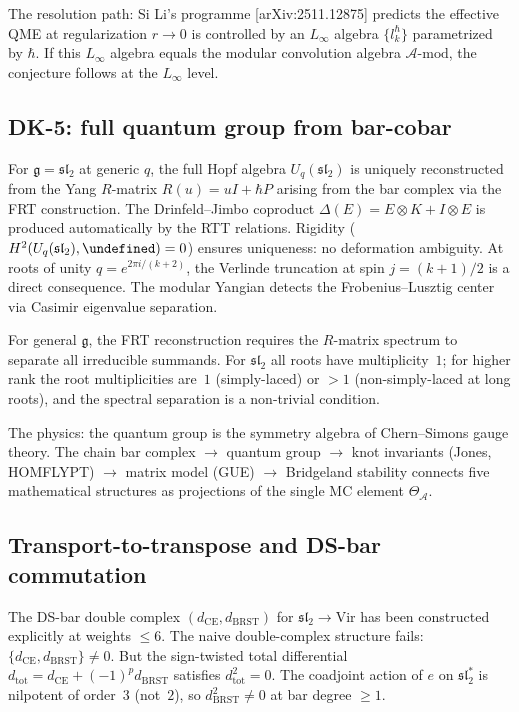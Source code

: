\documentclass[11pt]{article}
\let\Bbbk\undefined \let\openbox\undefined
\newcommand{\cA}{\mathcal{A}}
\newcommand{\fg}{\mathfrak{g}}
\newcommand{\gAmod}{\mathcal{A}\text{-mod}}
\providecommand{\bk}{\Bbbk}
\begin{document}
The resolution path: Si Li's programme [arXiv:2511.12875]
predicts the effective QME at regularization $r \to 0$ is
controlled by an $L_\infty$ algebra $\{l_k^{\hbar}\}$
parametrized by $\hbar$. If this $L_\infty$ algebra equals
the modular convolution algebra $\gAmod$, the conjecture
follows at the $L_\infty$ level.

\subsection{DK-5: full quantum group from bar-cobar}

For $\fg = \mathfrak{sl}_2$ at generic $q$, the full Hopf algebra
$U_q(\mathfrak{sl}_2)$ is uniquely reconstructed from the Yang
$R$-matrix $R(u) = uI + \hbar P$ arising from the bar complex
via the FRT construction. The Drinfeld--Jimbo coproduct
$\Delta(E) = E \otimes K + I \otimes E$ is produced automatically
by the RTT relations. Rigidity ($H^2(U_q(\mathfrak{sl}_2), \bk) = 0$)
ensures uniqueness: no deformation ambiguity. At roots of unity
$q = e^{2\pi i/(k+2)}$, the Verlinde truncation at spin $j = (k+1)/2$
is a direct consequence. The modular Yangian detects the
Frobenius--Lusztig center via Casimir eigenvalue separation.

For general $\fg$, the FRT reconstruction requires the $R$-matrix
spectrum to separate all irreducible summands. For $\mathfrak{sl}_2$
all roots have multiplicity~$1$; for higher rank the root
multiplicities are~$1$ (simply-laced) or $> 1$ (non-simply-laced
at long roots), and the spectral separation is a non-trivial condition.

The physics: the quantum group is the symmetry algebra of
Chern--Simons gauge theory. The chain
bar complex $\to$ quantum group $\to$ knot invariants (Jones,
HOMFLYPT) $\to$ matrix model (GUE) $\to$ Bridgeland stability
connects five mathematical structures as projections of the
single MC element $\Theta_\cA$.

\subsection{Transport-to-transpose and DS-bar commutation}

The DS-bar double complex $(d_{\mathrm{CE}}, d_{\mathrm{BRST}})$
for $\mathfrak{sl}_2 \to \mathrm{Vir}$ has been constructed
explicitly at weights $\leq 6$. The naive double-complex
structure fails: $\{d_{\mathrm{CE}}, d_{\mathrm{BRST}}\} \neq 0$.
But the sign-twisted total differential
$d_{\mathrm{tot}} = d_{\mathrm{CE}} + (-1)^p d_{\mathrm{BRST}}$
satisfies $d_{\mathrm{tot}}^2 = 0$. The coadjoint action of $e$
on $\mathfrak{sl}_2^*$ is nilpotent of order~$3$ (not~$2$), so
$d_{\mathrm{BRST}}^2 \neq 0$ at bar degree $\geq 1$.
\end{document}
